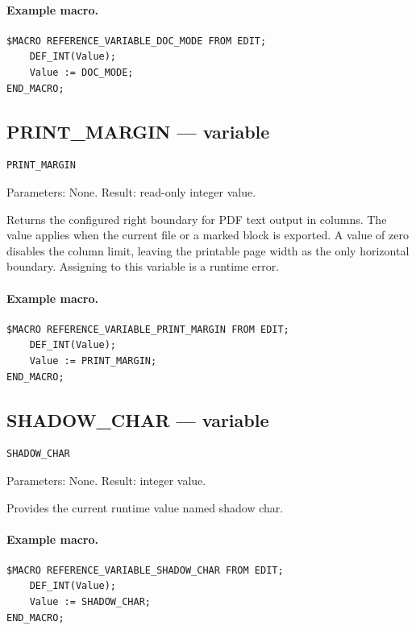 \documentclass[a4paper,10pt,twoside,openany]{book}
\begin{document}
\paragraph{Example macro.}
\begin{verbatim}
$MACRO REFERENCE_VARIABLE_DOC_MODE FROM EDIT;
    DEF_INT(Value);
    Value := DOC_MODE;
END_MACRO;
\end{verbatim}

\label{prim:variable-print-margin}
\subsection*{PRINT\_MARGIN --- variable}
\begin{verbatim}
PRINT_MARGIN
\end{verbatim}
Parameters: None. Result: read-only integer value.

Returns the configured right boundary for PDF text output in columns.  The
value applies when the current file or a marked block is exported.  A value of
zero disables the column limit, leaving the printable page width as the only
horizontal boundary.  Assigning to this variable is a runtime error.

\paragraph{Example macro.}
\begin{verbatim}
$MACRO REFERENCE_VARIABLE_PRINT_MARGIN FROM EDIT;
    DEF_INT(Value);
    Value := PRINT_MARGIN;
END_MACRO;
\end{verbatim}

\label{prim:variable-shadow-char}
\subsection*{SHADOW\_CHAR --- variable}
\begin{verbatim}
SHADOW_CHAR
\end{verbatim}
Parameters: None. Result: integer value.

Provides the current runtime value named shadow char.

\paragraph{Example macro.}
\begin{verbatim}
$MACRO REFERENCE_VARIABLE_SHADOW_CHAR FROM EDIT;
    DEF_INT(Value);
    Value := SHADOW_CHAR;
END_MACRO;
\end{verbatim}
\end{document}
